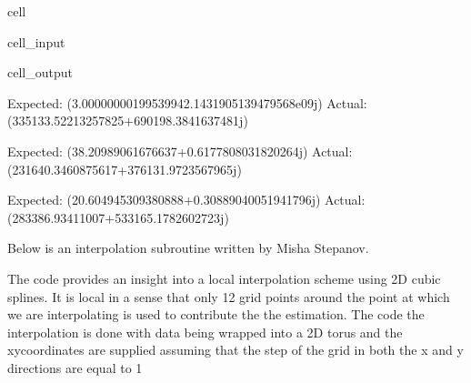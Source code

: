 \documentclass[letterpaper,10pt,english]{jupyterBook}
\begin{document}
\begin{sphinxuseclass}{cell}
\begin{sphinxVerbatimInput}
\begin{sphinxuseclass}{cell_input}
\end{sphinxuseclass}\end{sphinxVerbatimInput}
\begin{sphinxVerbatimOutput}

\begin{sphinxuseclass}{cell_output}
\begin{sphinxVerbatim}[commandchars=\\\{\}]
Expected: (3.0000000019953994\PYGZhy{}2.1431905139479568e\PYGZhy{}09j) 
Actual: (\PYGZhy{}335133.52213257825+690198.3841637481j)

Expected: (38.20989061676637+0.6177808031820264j) 
Actual: (\PYGZhy{}231640.3460875617+376131.9723567965j)

Expected:  (20.604945309380888+0.30889040051941796j) 
Actual: (\PYGZhy{}283386.93411007+533165.1782602723j)
\end{sphinxVerbatim}

\end{sphinxuseclass}\end{sphinxVerbatimOutput}

\end{sphinxuseclass}
\sphinxAtStartPar
Below is an interpolation subroutine written by Misha Stepanov.

\sphinxAtStartPar
The code provides an insight into a local interpolation scheme using 2D cubic splines. It is local in a sense that only 12 grid points around the point at which we are interpolating is used to contribute the the estimation. The code the interpolation is done with data being wrapped into a 2D torus and the xy\sphinxhyphen{}coordinates are supplied assuming that the step of the grid in both the x and y directions are equal to 1
\end{document}
